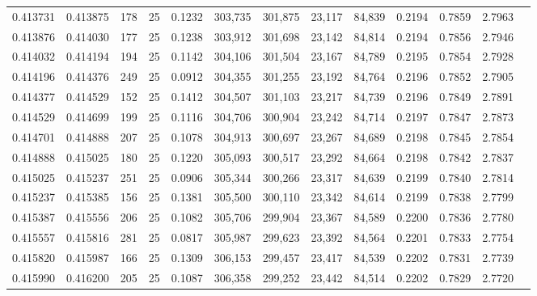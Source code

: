 \begin{tabular}{rrrrrrrrrrrrr}
0.413731 & 0.413875 &   178 &  25 &                                     0.1232 & 303,735 & 301,875 &  23,117 &  84,839 & 0.2194 & 0.7859 & 2.7963 \\
0.413876 & 0.414030 &   177 &  25 &                                     0.1238 & 303,912 & 301,698 &  23,142 &  84,814 & 0.2194 & 0.7856 & 2.7946 \\
0.414032 & 0.414194 &   194 &  25 &                                     0.1142 & 304,106 & 301,504 &  23,167 &  84,789 & 0.2195 & 0.7854 & 2.7928 \\
0.414196 & 0.414376 &   249 &  25 &                                     0.0912 & 304,355 & 301,255 &  23,192 &  84,764 & 0.2196 & 0.7852 & 2.7905 \\
0.414377 & 0.414529 &   152 &  25 &                                     0.1412 & 304,507 & 301,103 &  23,217 &  84,739 & 0.2196 & 0.7849 & 2.7891 \\
0.414529 & 0.414699 &   199 &  25 &                                     0.1116 & 304,706 & 300,904 &  23,242 &  84,714 & 0.2197 & 0.7847 & 2.7873 \\
0.414701 & 0.414888 &   207 &  25 &                                     0.1078 & 304,913 & 300,697 &  23,267 &  84,689 & 0.2198 & 0.7845 & 2.7854 \\
0.414888 & 0.415025 &   180 &  25 &                                     0.1220 & 305,093 & 300,517 &  23,292 &  84,664 & 0.2198 & 0.7842 & 2.7837 \\
0.415025 & 0.415237 &   251 &  25 &                                     0.0906 & 305,344 & 300,266 &  23,317 &  84,639 & 0.2199 & 0.7840 & 2.7814 \\
0.415237 & 0.415385 &   156 &  25 &                                     0.1381 & 305,500 & 300,110 &  23,342 &  84,614 & 0.2199 & 0.7838 & 2.7799 \\
0.415387 & 0.415556 &   206 &  25 &                                     0.1082 & 305,706 & 299,904 &  23,367 &  84,589 & 0.2200 & 0.7836 & 2.7780 \\
0.415557 & 0.415816 &   281 &  25 &                                     0.0817 & 305,987 & 299,623 &  23,392 &  84,564 & 0.2201 & 0.7833 & 2.7754 \\
0.415820 & 0.415987 &   166 &  25 &                                     0.1309 & 306,153 & 299,457 &  23,417 &  84,539 & 0.2202 & 0.7831 & 2.7739 \\
0.415990 & 0.416200 &   205 &  25 &                                     0.1087 & 306,358 & 299,252 &  23,442 &  84,514 & 0.2202 & 0.7829 & 2.7720 \\

\end{tabular}

